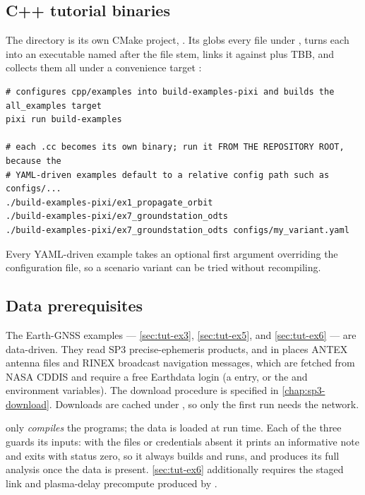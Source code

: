 \subsection{C++ tutorial binaries}
\label{sec:tut-running-cpp}

The directory  is its own CMake project, .
Its  globs every  file under ,
turns each into an executable named after the file stem, links it against
 plus TBB, and collects them all under a convenience target
:

\begin{lstlisting}[language=shell, caption={Building and running the C++ examples.}, label={lst:tut-run-cpp}]
# configures cpp/examples into build-examples-pixi and builds the all_examples target
pixi run build-examples

# each .cc becomes its own binary; run it FROM THE REPOSITORY ROOT, because the
# YAML-driven examples default to a relative config path such as configs/...
./build-examples-pixi/ex1_propagate_orbit
./build-examples-pixi/ex7_groundstation_odts
./build-examples-pixi/ex7_groundstation_odts configs/my_variant.yaml
\end{lstlisting}

Every YAML-driven example takes an optional first argument overriding the
configuration file, so a scenario variant can be tried without recompiling.

\subsection{Data prerequisites}
\label{sec:tut-running-data}

The Earth-GNSS examples --- \cref{sec:tut-ex3}, \cref{sec:tut-ex5}, and
\cref{sec:tut-ex6} --- are data-driven. They read SP3 precise-ephemeris
products, and in places ANTEX antenna files and RINEX broadcast navigation
messages, which are fetched from NASA CDDIS and require a free Earthdata login
(a  entry, or the  and
 environment variables). The download procedure is
specified in \cref{chap:sp3-download}. Downloads are cached under
, so only the first run needs the network.

\begin{lupntwarning}
 only \emph{compiles} the programs; the data is
loaded at run time. Each of the three guards its inputs: with the files or
credentials absent it prints an informative note and exits with status zero, so
it always builds and runs, and produces its full analysis once the data is
present. \cref{sec:tut-ex6} additionally requires the staged link and
plasma-delay precompute produced by .
\end{lupntwarning}

